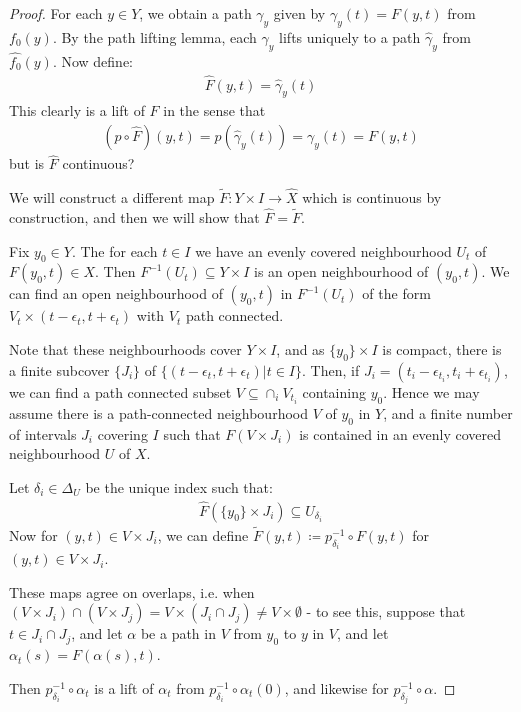 \documentclass[10pt,a4paper]{article}
\begin{document}
\begin{proof}
For each $y \in Y$, we obtain a path $\gamma_y$ given by $\gamma_y(t) = F(y,t)$ from $f_0(y)$. By the path lifting lemma, each $\gamma_y$ lifts uniquely to a path $\hat{\gamma}_y$ from $\hat{f_0}(y)$. Now define:
\begin{align*}
\hat{F}(y, t) = \hat{\gamma}_y(t)
\end{align*}
This clearly is a lift of $F$ in the sense that
\begin{align*}
(p\circ \hat{F})(y,t) = p(\hat{\gamma}_y(t)) = \gamma_y(t) = F(y,t)
\end{align*}
but is $\hat{F}$ continuous?

We will construct a different map $\tilde{F}:Y\times I \to \hat{X}$ which is continuous by construction, and then we will show that $\hat{F} = \tilde{F}$.

Fix $y_0 \in Y$. The for each $t\in I$ we have an evenly covered neighbourhood $U_t$ of $F(y_0, t) \in X$. Then $F^{-1}(U_t) \subseteq Y\times I$ is an open neighbourhood of $(y_0, t)$. We can find an open neighbourhood of $(y_0, t)$ in $F^{-1}(U_t)$ of the form $V_t \times (t-\epsilon_t, t+ \epsilon_t)$ with $V_t$ path connected.

Note that these neighbourhoods cover $Y\times I$, and as $\{y_0\}\times I$ is compact, there is a finite subcover $\{J_i\}$ of $\{(t-\epsilon_t, t+\epsilon_t)| t\in I\}$. Then, if $J_i = (t_i-\epsilon_{t_i}, t_i + \epsilon_{t_i})$, we can find a path connected subset $V\subseteq \cap_i V_{t_i}$ containing $y_0$. Hence we may assume there is a path-connected neighbourhood $V$ of $y_0$ in $Y$, and a finite number of intervals $J_i$ covering $I$ such that $F(V\times J_i)$ is contained in an evenly covered neighbourhood $U$ of $X$.

Let $\delta_i \in \Delta_U$ be the unique index such that:
\begin{align*}
\hat{F}(\{y_0\}\times J_i) \subseteq U_{\delta_i}
\end{align*}
Now for $(y,t)\in V\times J_i$, we can define $\tilde{F}(y,t) \coloneqq p^{-1}_{\delta_i} \circ F(y,t)$ for $(y,t) \in V\times J_i$.

These maps agree on overlaps, i.e. when $(V\times J_i)\cap(V\times J_j) = V\times(J_i\cap J_j) \neq V\times\emptyset$ - to see this, suppose that $t\in J_i \cap J_j$, and let $\alpha$ be a path in $V$ from $y_0$ to $y$ in $V$, and let $\alpha_t(s) = F(\alpha(s),t)$.

Then $p_{\delta_i}^{-1} \circ \alpha_t$ is a lift of $\alpha_t$ from $p_{\delta_i}^{-1}\circ \alpha_t(0)$, and likewise for $p_{\delta_j}^{-1}\circ \alpha$.


\end{proof}
\end{document}
